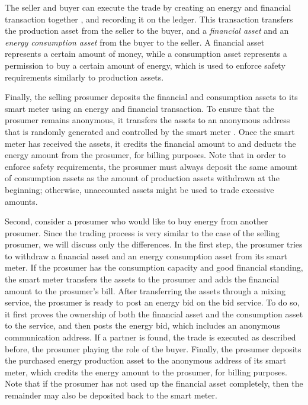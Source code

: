 The seller and buyer can execute the trade by creating an energy and financial transaction together , and recording it on the ledger.
This transaction transfers the production asset from the seller to the buyer, and a \emph{financial asset} and an \emph{energy consumption asset} from the buyer to the seller.
A financial asset represents a certain amount of money, while a consumption asset represents a permission to buy a certain amount of energy, which is used to enforce safety requirements similarly to production assets.

Finally, the selling prosumer deposits the financial and consumption assets to its smart meter using an energy and financial transaction.
To ensure that the prosumer remains anonymous, it transfers the assets to an anonymous address that is randomly generated and controlled by the smart meter .
Once the smart meter has received the assets, it credits the financial amount to and deducts the energy amount from the prosumer, for billing purposes.
Note that in order to enforce safety requirements, the prosumer must always deposit the same amount of consumption assets as the amount of production assets withdrawn at the beginning; otherwise, unaccounted assets might be used to trade excessive amounts.

Second, consider a prosumer who would like to buy energy from another prosumer.
Since the trading process is very similar to the case of the selling prosumer, we will discuss only the differences.
In the first step, the prosumer tries to withdraw a financial asset and an energy consumption asset from its smart meter.
If the prosumer has the consumption capacity and good financial standing, the smart meter transfers the assets to the prosumer and adds the financial amount to the prosumer's bill.
After transferring the assets through a mixing service, the prosumer is ready to post an energy bid on the bid service.
To do so, it first proves the ownership of both the financial asset and the consumption asset to the service, and then posts the energy bid, which includes an anonymous communication address.
If a partner is found, the trade is executed as described before, the prosumer playing the role of the buyer.
Finally, the prosumer deposits the purchased energy production asset to the anonymous address of its smart meter,
which credits the energy amount to the prosumer, for billing purposes.
Note that if the prosumer has not used up the financial asset completely, then the remainder may also be deposited back to the smart meter.





